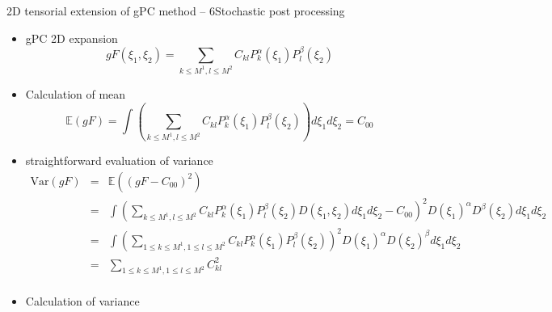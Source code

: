 \documentclass[10pt]{beamer}
\def\vt{\vspace{2mm}}
\def\begit{\begin{itemize}}
\def\endit{\end{itemize}}
\def\beas{\begin{eqnarray*}}
\def\eeas{\end{eqnarray*}}
\newcommand{\esp}{{\mathbb E}}
\newcommand{\Var}{\text{Var}}
\begin{document}
%
%
\begin{frame}{2D tensorial extension of gPC method -- 6}{Stochastic post processing}
%
\footnotesize{
%
\begit
%
\item gPC 2D expansion
%
     $$ gF(\xi_1,\xi_2) = \sum_{k\leq M^1,l \leq M^2} C_{kl} P^\alpha_k (\xi_1)  P^\beta_l (\xi_2)$$
%
\vt
\item Calculation of mean
      $$ \esp(gF) = \int \left( \sum_{k\leq M^1,l \leq M^2} C_{kl} P^\alpha_k (\xi_1)  P^\beta_l (\xi_2) \right) d\xi_1 d\xi_2 = C_{00} $$
\vt
\item straightforward evaluation of variance
\scriptsize{
 \beas    
 \Var(gF) &=& \esp((gF-C_{00})^2)\\
             &=&\int \left(  \sum_{k\leq M^1,l \leq M^2 } C_{kl} P^\alpha_k (\xi_1)  P^\beta_l (\xi_2) D(\xi_1,\xi_2)d\xi_1 d\xi_2 -C_{00}\right) ^2 D(\xi_1)^\alpha D^\beta(\xi_2)d\xi_1 d\xi_2 \\ 
             &=&\int \left(   \sum_{1\leq k\leq M^1,1\leq l \leq M^2} C_{kl} P^\alpha_k (\xi_1)  P^\beta_l (\xi_2) \right) ^2 D(\xi_1)^\alpha D(\xi_2)^\beta d\xi_1 d\xi_2 \\
             &=&\sum_{1\leq k\leq M^1,1\leq l \leq M^2} C_{kl}^2  \\ 
  \eeas
}
%
\vt
\item Calculation of variance
%   
\endit
%
}
%
\end{frame}
%
%
\end{document}
